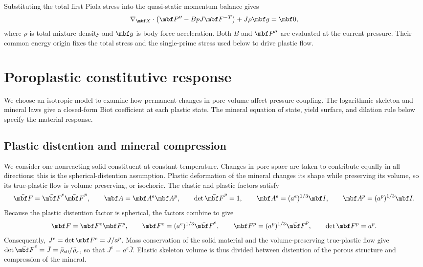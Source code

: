 Substituting the total first Piola stress into the
quasi-static momentum balance gives
\begin{equation}
 \nabla_{\mbf X}\mathbin{\cdot}
 \left(\mbf P^{\prime\prime}-BpJ\mbf F^{-T}\right)
 +J\rho\mbf g=\mbf0,
 \label{eq:reference-momentum-balance}
\end{equation}
where \(\rho\) is total mixture density and \(\mbf g\) is body-force
acceleration.  Both \(B\) and \(\mbf P^{\prime\prime}\) are evaluated at
the current pressure.  Their common energy origin fixes the total stress
and the single-prime stress used below to drive plastic flow.

\section{Poroplastic constitutive response}
\label{sec:inelastic-plastic-driving-stress}

We choose an isotropic model to examine how permanent changes in pore volume
affect pressure coupling.  The logarithmic skeleton and mineral laws give a
closed-form Biot coefficient at each plastic state.  The mineral equation of
state, yield surface, and dilation rule below specify the material
response.

\subsection{Plastic distention and mineral compression}

We consider one nonreacting solid constituent at constant temperature.
Changes in pore space are taken to contribute equally in all directions;
this is the spherical-distention assumption.  Plastic deformation of the
mineral changes its shape while preserving its volume, so its true-plastic
flow is volume preserving, or isochoric.  The elastic and plastic factors
satisfy
\begin{equation*}
 \bar{\mbf F}=\bar{\mbf F}^e\bar{\mbf F}^p,
 \qquad \mbf A=\mbf A^e\mbf A^p,
 \qquad \det\bar{\mbf F}^p=1,
 \qquad
 \mbf A^e=(a^e)^{1/3}\mbf I,
 \qquad \mbf A^p=(a^p)^{1/3}\mbf I.
\end{equation*}
Because the plastic distention factor is spherical, the factors combine to
give
\begin{equation*}
 \mbf F=\mbf F^e\mbf F^p,
 \qquad \mbf F^e=(a^e)^{1/3}\bar{\mbf F}^e,
 \qquad \mbf F^p=(a^p)^{1/3}\bar{\mbf F}^p,
 \qquad \det\mbf F^p=a^p.
\end{equation*}
Consequently, \(J^e=\det\mbf F^e=J/a^p\).  Mass conservation of the solid
material and the volume-preserving true-plastic flow give
\(\det\bar{\mbf F}^e=\bar J=\bar\rho_{s0}/\bar\rho_s\), so that
\(J^e=a^e\bar J\).  Elastic skeleton volume is thus divided between
distention of the porous structure and compression of the mineral.

